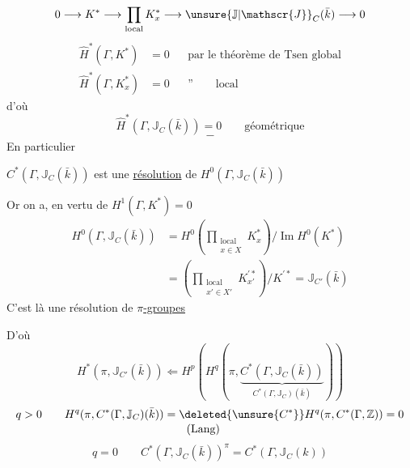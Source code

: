 \[
0\longrightarrow K^*\longrightarrow\prod_{\mathrm{local}}K_x^*\longrightarrow{\unsure{\mathbb{J}|\mathscr{J}}}_C(\bar{k})\longrightarrow0
\]
\[
\begin{aligned}
\widehat H^*(\Gamma,K^*)&=0&&\text{par le théorème de Tsen global}\\
\widehat H^*(\Gamma,K_x^*)&=0&&\text{''}\qquad\text{local}
\end{aligned}
\]
d'où
\[
\widehat H^*(\Gamma,\mathbb{J}_C(\bar{k}))=0\qquad\text{géométrique}
\]
\[-\]
En particulier


$C^*(\Gamma,\mathbb{J}_C(\bar{k}))$ est une \uline{résolution} de $H^0(\Gamma,\mathbb{J}_C(\bar{k}))$

Or on a, en vertu de $H^1(\Gamma,K^*)=0$
\[
\begin{aligned}
H^0(\Gamma,\mathbb{J}_C(\bar{k}))&=H^0\left(\prod_{\substack{\mathrm{local}\\x\in X}}K_x^*\right)/\operatorname{Im}H^0(K^*)\\
&=\left(\prod_{\substack{\mathrm{local}\\x'\in X'}}K_{x'}^{\prime *}\right)/K^{\prime *}=\mathbb{J}_{C'}(\bar{k})
\end{aligned}
\]
C'est là une résolution  de \uline{$\pi$-groupes}

D'où
\[
H^*(\pi,\mathbb{J}_{C'}(\bar{k}))\Longleftarrow H^p\left(H^q\left(\pi,\underbrace{C^*\left(\Gamma,\mathbb{J}_C(\bar{k})\right)}_{C^*(\Gamma,\mathbb{J}_C)(\bar{k})}\right)\right)
\]
\[
\begin{aligned}
q>0\qquad H^q(\pi,C^*(\Gamma,\mathbb{J}_C)(\bar{k}))
&=\deleted{{\unsure{C^*}}}H^q(\pi,C^*(\Gamma,\mathbb{Z}))=0\\[-2pt]
&\qquad\text{(Lang)}
\end{aligned}
\]
\[
q=0\qquad C^*(\Gamma,\mathbb{J}_C(\bar{k}))^\pi=C^*(\Gamma,\mathbb{J}_C(k))
\]
